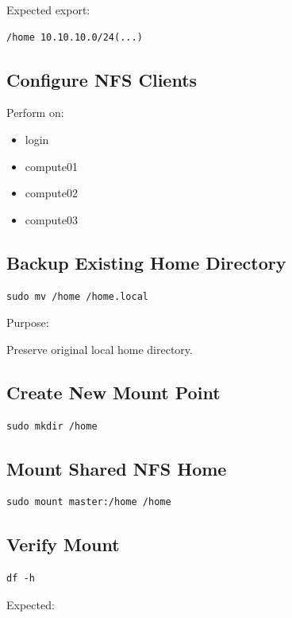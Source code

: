 \documentclass[11pt]{article}
\begin{document}
Expected export:

\begin{verbatim}
/home 10.10.10.0/24(...)
\end{verbatim}
\subsection{Configure NFS Clients}
\label{sec:org7a08022}

Perform on:

\begin{itemize}
\item login
\item compute01
\item compute02
\item compute03
\end{itemize}
\subsection{Backup Existing Home Directory}
\label{sec:orgf9faf5d}

\begin{verbatim}
sudo mv /home /home.local
\end{verbatim}

Purpose:

Preserve original local home directory.
\subsection{Create New Mount Point}
\label{sec:org04bc2da}

\begin{verbatim}
sudo mkdir /home
\end{verbatim}
\subsection{Mount Shared NFS Home}
\label{sec:org66a3cd6}

\begin{verbatim}
sudo mount master:/home /home
\end{verbatim}
\subsection{Verify Mount}
\label{sec:org241771c}

\begin{verbatim}
df -h
\end{verbatim}

Expected:
\end{document}
